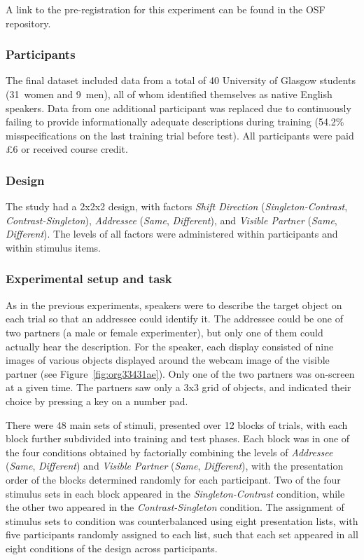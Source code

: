 \documentclass[natbib,doc,a4paper]{apa6}
\begin{document}
A link to the pre-registration for this experiment can be found in the OSF repository.

\subsubsection*{Participants}
\label{sec:org3955306}

The final dataset included data from a total of 40 University of Glasgow students (31~women and 9~men), all of whom identified themselves as native English speakers. Data from one additional participant was replaced due to continuously failing to provide informationally adequate descriptions during training (54.2\% misspecifications on the last training trial before test). All participants were paid £6 or received course credit.

\subsubsection*{Design}
\label{sec:org859db10}

The study had a 2x2x2 design, with factors \emph{Shift Direction} (\emph{Singleton-Contrast}, \emph{Contrast-Singleton}), \emph{Addressee} (\emph{Same}, \emph{Different}), and \emph{Visible Partner} (\emph{Same}, \emph{Different}). The levels of all factors were administered within participants and within stimulus items.

\subsubsection*{Experimental setup and task}
\label{sec:org76e8b9b}

As in the previous experiments, speakers were to describe the target object on each trial so that an addressee could identify it. The addressee could be one of two partners (a male or female experimenter), but only one of them could actually hear the description. For the speaker, each display consisted of nine images of various objects displayed around the webcam image of the visible partner (see Figure~\ref{fig:org33431ae}). Only one of the two partners was on-screen at a given time.  The partners saw only a 3x3 grid of objects, and indicated their choice by pressing a key on a number pad.

There were 48 main sets of stimuli, presented over 12 blocks of trials, with each block further subdivided into training and test phases. Each block was in one of the four conditions obtained by factorially combining the levels of \emph{Addressee} (\emph{Same}, \emph{Different}) and \emph{Visible Partner} (\emph{Same}, \emph{Different}), with the presentation order of the blocks determined randomly for each participant.  Two of the four stimulus sets in each block appeared in the \emph{Singleton-Contrast} condition, while the other two appeared in the \emph{Contrast-Singleton} condition.  The assignment of stimulus sets to condition was counterbalanced using eight presentation lists, with five participants randomly assigned to each list, such that each set appeared in all eight conditions of the design across participants.
\end{document}
